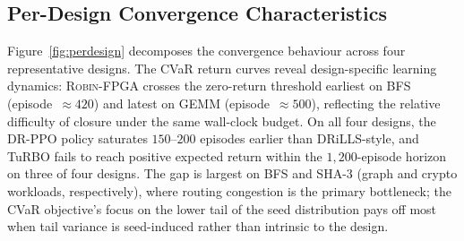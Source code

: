 \documentclass[journal,onecolumn=false]{IEEEtran}
\begin{document}
\subsection{Per-Design Convergence Characteristics}
\label{sec:perdesign}

Figure~\ref{fig:perdesign} decomposes the convergence behaviour across four representative designs. The CVaR return curves reveal design-specific learning dynamics: \textsc{Robin-FPGA} crosses the zero-return threshold earliest on BFS (episode~$\approx 420$) and latest on GEMM (episode~$\approx 500$), reflecting the relative difficulty of closure under the same wall-clock budget. On all four designs, the DR-PPO policy saturates $150$--$200$ episodes earlier than DRiLLS-style, and TuRBO fails to reach positive expected return within the $1{,}200$-episode horizon on three of four designs. The gap is largest on BFS and SHA-3 (graph and crypto workloads, respectively), where routing congestion is the primary bottleneck; the CVaR objective's focus on the lower tail of the seed distribution pays off most when tail variance is seed-induced rather than intrinsic to the design.
\end{document}
